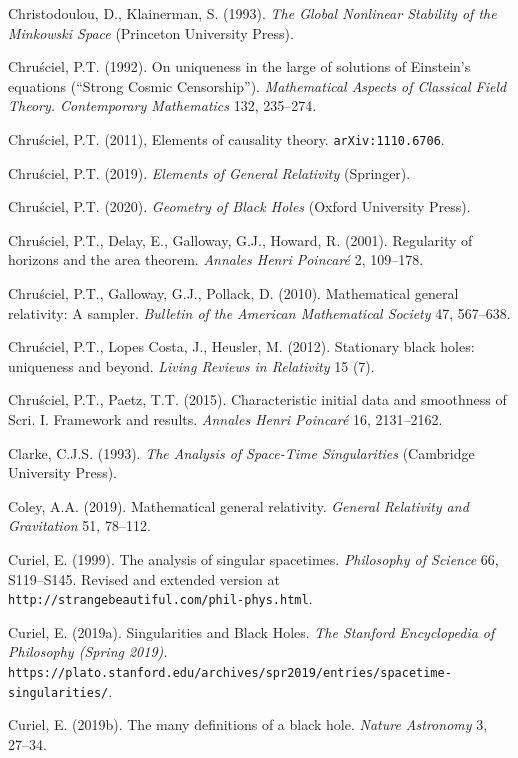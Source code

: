 \documentclass[12pt]{article}
\begin{document}
\begin{small}
\begin{thebibliography}{99}
 \item[] Christodoulou, D., Klainerman, S. (1993). \emph{The Global Nonlinear Stability of the Minkowski Space}
(Princeton University Press). 
 \item[] Chru\'{s}ciel, P.T.  (1992). On uniqueness in the large of solutions of Einstein's equations (``Strong Cosmic Censorship''). \emph{Mathematical Aspects of Classical Field Theory. Contemporary Mathematics} 132, 235--274.
 \item[]  Chru\'{s}ciel, P.T. (2011), Elements of causality theory. \texttt{arXiv:1110.6706}.
\item[]  Chru\'{s}ciel, P.T. (2019). \emph{Elements of General Relativity} (Springer). 
\item[]  Chru\'{s}ciel, P.T. (2020). \emph{Geometry of Black Holes} (Oxford University Press). 
\item[]   Chru\'{s}ciel, P.T., Delay, E., Galloway,  G.J., Howard, R. (2001). 
Regularity of horizons and the area theorem.
\emph{Annales Henri Poincar\'{e}} 2, 109--178. 
\item[]   Chru\'{s}ciel, P.T., Galloway, G.J.,  Pollack, D. (2010).
Mathematical general relativity: A sampler. \emph{Bulletin of the American Mathematical Society} 47, 567--638.
\item[] Chru\'{s}ciel, P.T.,  Lopes Costa, J.,  Heusler, M. (2012).
Stationary black holes: uniqueness and beyond. \emph{Living Reviews in Relativity} 15 (7).
\item[]  Chru\'{s}ciel, P.T., Paetz, T.T. (2015). Characteristic initial data and smoothness of Scri. I. Framework and results.
\emph{ Annales Henri Poincar\'{e}} 16, 2131--2162.
\item[]   Clarke,  C.J.S. (1993). \emph{The Analysis of Space-Time Singularities} (Cambridge University Press).
\item[] Coley, A.A. (2019). Mathematical general relativity. \emph{General Relativity and Gravitation} 51, 78--112.
\item[] Curiel, E. (1999).  The analysis of singular spacetimes. \emph{Philosophy of Science} 66, S119--S145. 
Revised and extended version at \verb#http://strangebeautiful.com/phil-phys.html#.
\item[] Curiel, E. (2019a). Singularities and Black Holes. \emph{The Stanford Encyclopedia of Philosophy (Spring 2019).}\\ \verb#https://plato.stanford.edu/archives/spr2019/entries/spacetime-singularities/#.
\item[] Curiel, E. (2019b). The many definitions of a black hole. \emph{Nature Astronomy} 3, 27--34.

\end{thebibliography}
\end{small}
\end{document}
